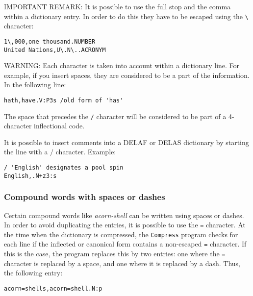 \bigskip
\noindent IMPORTANT REMARK: It is possible to use the full stop and the comma
within a dictionary entry. In order to do this they have to be escaped using the
\verb+\+ \index{\verbt{\textbackslash,}}\index{\verbt{\textbackslash~}} character:

\bigskip
\begin{verbatim}
1\,000,one thousand.NUMBER
United Nations,U\.N\..ACRONYM
\end{verbatim}


\bigskip
\noindent WARNING: Each character is taken into account within a dictionary
line. For example, if you insert spaces, they are considered to be a part of the
information. In the following line:

\begin{verbatim}
hath,have.V:P3s /old form of 'has'
\end{verbatim}

\bigskip \noindent The space that precedes the \verb+/+ character will be
considered to be part of a 4-character inflectional code.

\bigskip \noindent It is possible to insert comments into a DELAF or DELAS
dictionary by starting the line with a $/$ character. Example:

\bigskip
\begin{verbatim}
/ 'English' designates a pool spin
English,.N+z3:s
\end{verbatim}


\subsubsection{Compound words with spaces or dashes}

\index{\verbc{=}}\index{\verbt{\textbackslash=}}

Certain compound words like \textit{acorn-shell} can be written using spaces or
dashes. In order to avoid duplicating the entries, it is possible to use the
\verb+=+ character. At the time when the dictionary is compressed, the
\verb+Compress+ program  checks for each line if the
inflected or canonical form contains a non-escaped \verb+=+ character. If this is
the case, the program replaces this by two entries: one where the \verb+=+
character is replaced by a space, and one where it is replaced by a dash. Thus,
the following entry:

\bigskip \verb$acorn=shells,acorn=shell.N:p$

